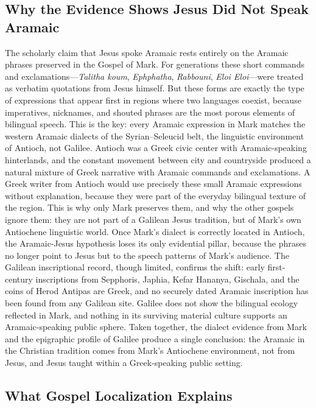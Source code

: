 \subsection{Why the Evidence Shows Jesus Did Not Speak Aramaic}

The scholarly claim that Jesus spoke Aramaic rests entirely on the Aramaic phrases preserved in the Gospel of Mark.
For generations these short commands and exclamations---\textit{Talitha koum}, \textit{Ephphatha}, \textit{Rabbouni}, \textit{Eloi Eloi}---were treated as verbatim quotations from Jesus himself.
But these forms are exactly the type of expressions that appear first in regions where two languages coexist, because imperatives, nicknames, and shouted phrases are the most porous elements of bilingual speech.
This is the key: every Aramaic expression in Mark matches the western Aramaic dialects of the Syrian--Seleucid belt, the linguistic environment of Antioch, not Galilee.
Antioch was a Greek civic center with Aramaic-speaking hinterlands, and the constant movement between city and countryside produced a natural mixture of Greek narrative with Aramaic commands and exclamations.
A Greek writer from Antioch would use precisely these small Aramaic expressions without explanation, because they were part of the everyday bilingual texture of the region.
This is why only Mark preserves them, and why the other gospels ignore them: they are not part of a Galilean Jesus tradition, but of Mark's own Antiochene linguistic world.
Once Mark's dialect is correctly located in Antioch, the Aramaic-Jesus hypothesis loses its only evidential pillar, because the phrases no longer point to Jesus but to the speech patterns of Mark's audience.
The Galilean inscriptional record, though limited, confirms the shift: early first-century inscriptions from Sepphoris, Japhia, Kefar Hananya, Gischala, and the coins of Herod Antipas are Greek, and no securely dated Aramaic inscription has been found from any Galilean site.
Galilee does not show the bilingual ecology reflected in Mark, and nothing in its surviving material culture supports an Aramaic-speaking public sphere.
Taken together, the dialect evidence from Mark and the epigraphic profile of Galilee produce a single conclusion: the Aramaic in the Christian tradition comes from Mark's Antiochene environment, not from Jesus, and Jesus taught within a Greek-speaking public setting.

\subsection{What Gospel Localization Explains}


